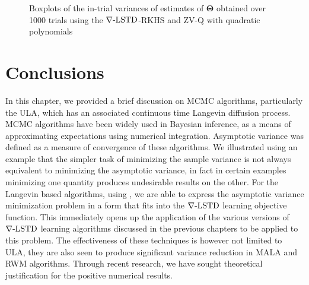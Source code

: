 \begin{figure}[htbp]
{		 
	} 
\caption{Boxplots of the in-trial variances of estimates of $\boldsymbol{\Theta}$ obtained over 1000 trials using the $\nabla\text{-LSTD}$-RKHS and ZV-Q with quadratic polynomials}
\label{fig:mcmc_box_var_Theta}
\end{figure}

\section{Conclusions}
In this chapter, we provided a brief discussion on MCMC algorithms, particularly the ULA, which has an associated continuous time Langevin diffusion process. MCMC algorithms have been widely used in Bayesian inference, as a means of approximating expectations using numerical integration. Asymptotic variance was defined as a measure of convergence of these algorithms. We illustrated using an example that the simpler task of minimizing the sample variance is not always equivalent to minimizing the asymptotic variance, in fact in certain examples minimizing one quantity produces undesirable results on the other. For the Langevin based algorithms, using , we are able to express the asymptotic variance minimization problem in a form that fits into the $\nabla\text{-LSTD}$ learning objective function. This immediately opens up the application of the various versions of $\nabla\text{-LSTD}$ learning algorithms discussed in the previous chapters to be applied to this problem. The effectiveness of these techniques is however not limited to ULA, they are also seen to produce significant variance reduction in MALA and RWM algorithms. Through recent research, we have sought theoretical justification for the positive numerical results.  

